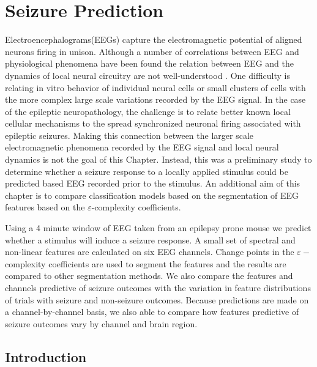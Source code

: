 \chapter{Seizure Prediction}

Electroencephalograms(EEGs) capture the electromagnetic 
potential of aligned neurons firing in unison. 
Although a number of correlations between 
EEG and physiological phenomena have been found the relation between EEG and the dynamics of local neural circuitry are not well-understood \cite{eeg}. 
One difficulty is relating in vitro behavior of individual neural cells or small clusters of cells with the more complex 
large scale variations recorded by the EEG signal.  
In the case of the epileptic neuropathology, 
the challenge is to relate better known 
local cellular mechanisms to 
the spread synchronized neuronal firing associated with 
epileptic seizures. Making this connection between 
the larger scale electromagnetic phenomena recorded 
by the EEG signal and local neural dynamics is 
not the goal of this Chapter. Instead, this was 
a preliminary study to determine whether 
a seizure response to a locally applied stimulus
could be predicted based EEG recorded prior to the stimulus.
An additional aim of this chapter is to compare 
classification models based on the segmentation of 
EEG features based on the $\varepsilon$-complexity
coefficients.

Using a 4 minute window of EEG taken from an 
epilepsy prone mouse we predict whether a stimulus
will induce a seizure response.  
A small set of spectral and non-linear 
features are calculated on six EEG channels. 
Change points in the $\varepsilon-$complexity coefficients
are used to segment the features and the results 
are compared to other segmentation methods.
We also compare the features and 
channels predictive of seizure outcomes with 
the variation in feature distributions of trials with
seizure and non-seizure outcomes. Because predictions are 
made on a channel-by-channel basis, we also able to compare 
how features predictive of seizure outcomes vary 
by channel and brain region.


\section{Introduction}

